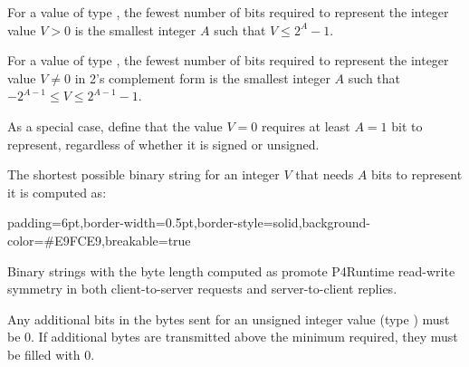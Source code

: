 \documentclass[11pt]{article}
\begin{document}
{%
For a value of type , the fewest number of bits required to represent
the integer value $V > 0$ is the smallest integer $A$ such that $V \leq 2^A -1$.%

For a value of type , the fewest number of bits required to represent
the integer value $V \neq 0$ in 2's complement form is the smallest integer $A$
such that $-2^{A-1} \leq V \leq 2^{A-1} - 1$.%

As a special case, define that the value $V=0$ requires at least $A=1$ bit to
represent, regardless of whether it is signed or unsigned.%

The shortest possible binary string for an integer $V$ that needs $A$ bits to
represent it is computed as:%

\begin{mdbmargintb}{6pt}{6pt}%
\begin{mdblock}{padding=6pt,border-width=0.5pt,border-style=solid,background-color=\#E9FCE9,breakable=true}%
\begin{mdpre}%
\end{mdpre}%
\end{mdblock}%
\end{mdbmargintb}%

\noindent{}Binary strings with the byte length computed as  promote
P4Runtime read-write symmetry in both client-to-server requests and
server-to-client replies.%

Any additional bits in the bytes sent for an unsigned integer value (type
) must be 0.  If additional bytes are transmitted above the
 minimum required, they must be filled with 0.%

}
\end{document}
